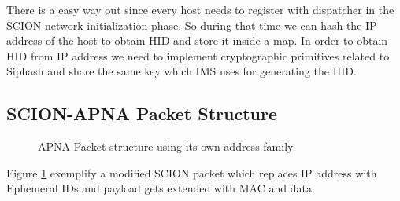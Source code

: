 There is a easy way out since every host needs to register with dispatcher in the SCION network initialization phase. So during that time we can hash the IP address of the host to obtain HID and store it inside a map. In order to obtain HID from IP address we need to implement cryptographic primitives related to Siphash and share the same key which IMS uses for generating the HID.

\subsection{SCION-APNA Packet Structure}
\begin{figure}[th!!]
\centering
\noindent
{}
\decoRule
\caption[APNA packet structure using its own address family]{APNA Packet structure  using its own address family}
\label{fig:apna_scion_addr}
\end{figure}
Figure  \ref{fig:apna_scion_addr} exemplify a modified SCION packet which replaces IP address with Ephemeral IDs and payload gets extended with MAC and data.


